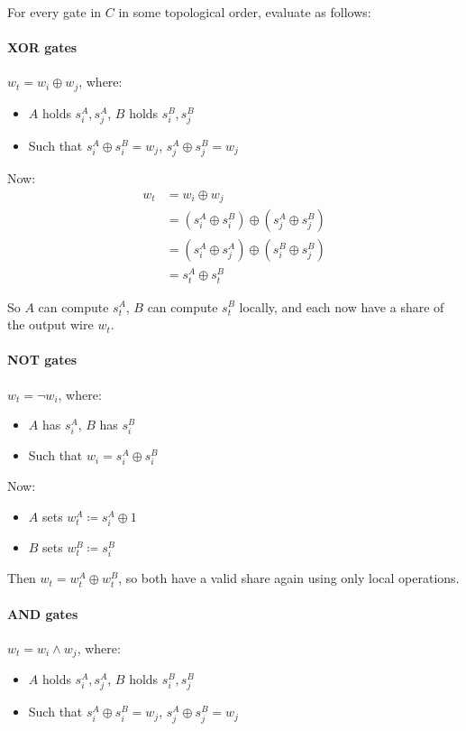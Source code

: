For every gate in $C$ in some topological order, evaluate as follows:

\paragraph{XOR gates}

$w_t = w_i \oplus w_j$, where:
\begin{itemize}
		\item $A$ holds $s^A_i, s^A_j$, $B$ holds $s^B_i, s^B_j$
		\item Such that $s^A_i \oplus s^B_i = w_j$, $s^A_j \oplus s^B_j = w_j$
\end{itemize}

Now:
\begin{align*}
		w_t & = w_i \oplus w_j \\
			& = (s^A_i \oplus s^B_i) \oplus (s^A_j \oplus s^B_j) \\
			& = (s^A_i \oplus s^A_j) \oplus (s^B_i \oplus s^B_j) \\
			& = s^A_t \oplus s^B_t
\end{align*}

So $A$ can compute $s^A_t$, $B$ can compute $s^B_t$ locally, and each now have
a share of the output wire $w_t$.

\paragraph{NOT gates}

$w_t = \neg w_i$, where:
\begin{itemize}
		\item $A$ has $s^A_i$, $B$ has $s^B_i$
		\item Such that $w_i = s^A_i \oplus s^B_i$
\end{itemize}

Now:
\begin{itemize}
		\item $A$ sets $w^A_t \coloneqq s^A_i \oplus 1$
		\item $B$ sets $w^B_t \coloneqq s^B_i$
\end{itemize}

Then $w_t = w^A_t \oplus w^B_t$, so both have a valid share again using only
local operations.

\paragraph{AND gates}

$w_t = w_i \land w_j$, where:
\begin{itemize}
		\item $A$ holds $s^A_i, s^A_j$, $B$ holds $s^B_i, s^B_j$
		\item Such that $s^A_i \oplus s^B_i = w_j$, $s^A_j \oplus s^B_j = w_j$
\end{itemize}

